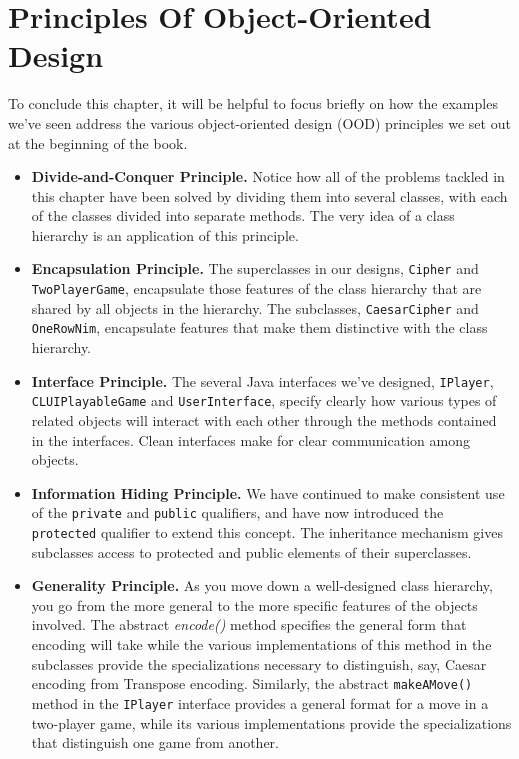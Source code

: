\section{Principles Of Object-Oriented Design}

To conclude this chapter, it will be helpful to focus briefly on how
the examples we've seen address the various object-oriented design
(OOD) principles we set out at the beginning of the book.

\begin{itemize}
\item {\bf Divide-and-Conquer Principle.}  Notice how all of the
problems tackled in this chapter have been solved by dividing them
into several classes, with each of the classes divided into separate
methods.  The very idea of a class hierarchy is an application of
this principle.

\item {\bf Encapsulation Principle.} The superclasses in our designs,
{\tt Cipher} and {\tt TwoPlayerGame}, encapsulate those features of the
class hierarchy that are shared by all objects in the hierarchy. The
subclasses, {\tt CaesarCipher} and {\tt OneRowNim}, encapsulate features
that make them distinctive with the class hierarchy. 

\item {\bf Interface Principle.}  The several Java interfaces we've
designed, {\tt IPlayer}, {\tt CLUIPlayableGame} and {\tt UserInterface},
specify clearly how various types of related objects will interact
with each other through the methods contained in the interfaces.
Clean interfaces make for clear communication among objects.

\item {\bf Information Hiding Principle.} We have continued to make
consistent use of the {\tt private} and {\tt public} qualifiers, and have
now introduced the {\tt protected} qualifier to extend this concept. 
The inheritance mechanism gives subclasses access to protected and
public elements of their superclasses.  

\item {\bf Generality Principle.}  As you move down a well-designed
class hierarchy, you go from the more general to the more specific
features of the objects involved. The abstract {\em encode()} method
specifies the general form that encoding will take while the various
implementations of this method in the subclasses provide the
specializations necessary to distinguish, say, Caesar encoding from
Transpose encoding.  Similarly, the abstract {\tt makeAMove()} method
in the {\tt IPlayer} interface  provides a general format for
a move in a two-player game, while its various implementations provide
the specializations that distinguish one game from another.


\end{itemize}
